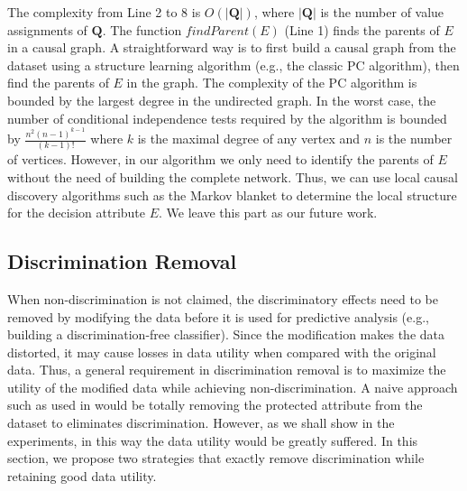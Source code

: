 \documentclass[twoside,leqno,twocolumn]{article}
\begin{document}
The complexity from Line 2 to 8 is $O(|\mathbf{Q}|)$, where $|\mathbf{Q}|$ is the number of value assignments of $\mathbf{Q}$. The function $findParent(E)$ (Line 1) finds the parents of $E$ in a causal graph. A straightforward way is to first build a causal graph from the dataset using a structure learning algorithm (e.g., the classic PC algorithm), then find the parents of $E$ in the graph. %
The complexity of the PC algorithm
is bounded by the largest degree in the
undirected graph. In the worst case, the number of conditional
independence tests required by the algorithm is bounded by
$\frac{n^2{(n-1)}^{k-1}}{(k-1)!}$ where $k$ is the maximal degree of
any vertex and $n$ is the number of vertices.
However, in our algorithm we only need to identify the parents of $E$ without the need of building the complete network.
Thus, we can use local causal discovery algorithms such as the Markov blanket \cite{statnikov2013algorithms} to determine the local structure for the decision attribute $E$. 
We leave this part as our future work.

\subsection{Discrimination Removal}
When non-discrimination is not claimed, the discriminatory effects need to be removed by modifying the data before it is used for predictive analysis (e.g., building a discrimination-free classifier). Since the modification makes the data distorted, it may cause losses in data utility when compared with the original data. Thus, a general requirement in discrimination removal is to maximize the utility of the modified data while achieving non-discrimination. 
A naive approach such as used in \cite{feldman2015certifying} would be totally removing the protected attribute from the dataset to eliminates discrimination. However, as we shall show in the experiments, in this way the data utility would be greatly suffered. In this section, we propose two strategies that exactly remove discrimination while retaining good data utility. %
\end{document}
